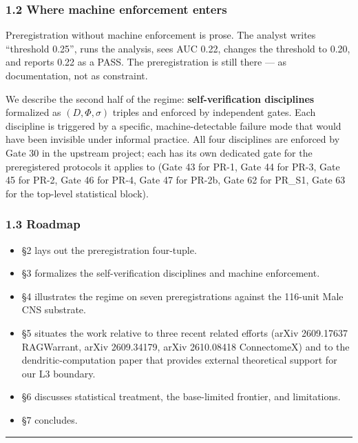 \documentclass[
]{article}
\providecommand{\tightlist}{%
  \setlength{\itemsep}{0pt}\setlength{\parskip}{0pt}}
\begin{document}
\subsubsection{1.2 Where machine enforcement
enters}\label{where-machine-enforcement-enters}

Preregistration without machine enforcement is prose. The analyst writes
``threshold 0.25'', runs the analysis, sees AUC 0.22, changes the
threshold to 0.20, and reports 0.22 as a PASS. The preregistration is
still there --- as documentation, not as constraint.

We describe the second half of the regime: \textbf{self-verification
disciplines} formalized as \((D, \Phi, \sigma)\) triples and enforced by
independent gates. Each discipline is triggered by a specific,
machine-detectable failure mode that would have been invisible under
informal practice. All four disciplines are enforced by Gate 30 in the
upstream project; each has its own dedicated gate for the preregistered
protocols it applies to (Gate 43 for PR-1, Gate 44 for PR-3, Gate 45 for
PR-2, Gate 46 for PR-4, Gate 47 for PR-2b, Gate 62 for PR\_S1, Gate 63
for the top-level statistical block).

\subsubsection{1.3 Roadmap}\label{roadmap}

\begin{itemize}
\tightlist
\item
  §2 lays out the preregistration four-tuple.
\item
  §3 formalizes the self-verification disciplines and machine
  enforcement.
\item
  §4 illustrates the regime on seven preregistrations against the
  116-unit Male CNS substrate.
\item
  §5 situates the work relative to three recent related efforts (arXiv
  2609.17637 RAGWarrant, arXiv 2609.34179, arXiv 2610.08418 ConnectomeX)
  and to the \citet{ref35} dendritic-computation paper that provides external
  theoretical support for our L3 boundary.
\item
  §6 discusses statistical treatment, the base-limited frontier, and
  limitations.
\item
  §7 concludes.
\end{itemize}

\begin{center}\rule{0.5\linewidth}{0.5pt}\end{center}
\end{document}

